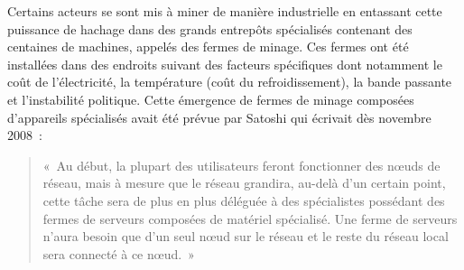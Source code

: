 
Certains acteurs se sont mis à miner de manière industrielle en entassant cette puissance de hachage dans des grands entrepôts spécialisés contenant des centaines de machines, appelés des fermes de minage. Ces fermes ont été installées dans des endroits suivant des facteurs spécifiques dont notamment le coût de l'électricité, la température (coût du refroidissement), la bande passante et l'instabilité politique. Cette émergence de fermes de minage composées d'appareils spécialisés avait été prévue par Satoshi qui écrivait dès novembre 2008~:

\begin{quote}
«~Au début, la plupart des utilisateurs feront fonctionner des nœuds de réseau, mais à mesure que le réseau grandira, au-delà d'un certain point, cette tâche sera de plus en plus déléguée à des spécialistes possédant des fermes de serveurs composées de matériel spécialisé. Une ferme de serveurs n'aura besoin que d'un seul nœud sur le réseau et le reste du réseau local sera connecté à ce nœud.~»
\end{quote}



